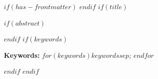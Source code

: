 
$if(has-frontmatter)$
\frontmatter
$endif$
$if(title)$
\maketitle
$if(abstract)$
\begin{abstract}
$abstract$
\end{abstract}
$endif$
$if(keywords)$
\par\vspace{0.5em}
\noindent\textbf{Keywords:} \textit{$for(keywords)$$keywords$$sep$; $endfor$}
\par\vspace{1.0em}
$endif$
$endif$
